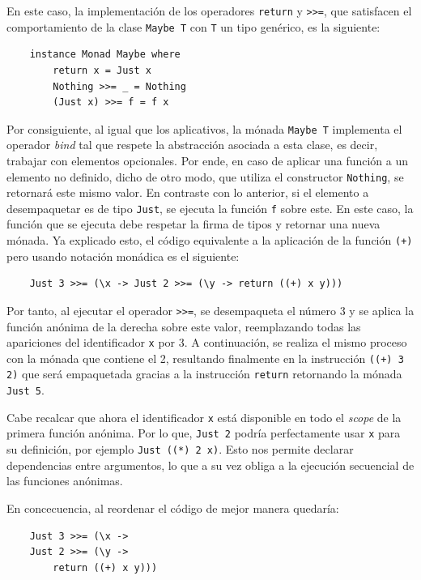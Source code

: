 En este caso, la implementación de los operadores \verb|return| y \verb|>>=|, que satisfacen el comportamiento de la clase \verb|Maybe T| con \verb|T| un tipo genérico, es la siguiente:

\begin{verbatim}
    instance Monad Maybe where
        return x = Just x
        Nothing >>= _ = Nothing
        (Just x) >>= f = f x
\end{verbatim}

Por consiguiente, al igual que los aplicativos, la mónada \verb|Maybe T| implementa el operador \textit{bind} tal que respete la abstracción asociada a esta clase, es decir, trabajar con elementos opcionales. Por ende, en caso de aplicar una función a un elemento no definido, dicho de otro modo, que utiliza el constructor \verb|Nothing|, se retornará este mismo valor. En contraste con lo anterior, si el elemento a desempaquetar es de tipo \verb|Just|, se ejecuta la función \verb|f| sobre este. En este caso, la función que se ejecuta debe respetar la firma de tipos y retornar una nueva mónada. Ya explicado esto, el código equivalente a la aplicación de la función \verb|(+)| pero usando notación monádica es el siguiente: 

\begin{verbatim}
    Just 3 >>= (\x -> Just 2 >>= (\y -> return ((+) x y)))
\end{verbatim}

Por tanto, al ejecutar el operador \verb|>>=|, se desempaqueta el número 3 y se aplica la función anónima de la derecha sobre este valor, reemplazando todas las apariciones del identificador \texttt{x} por 3. A continuación, se realiza el mismo proceso con la mónada que contiene el 2, resultando finalmente en la instrucción \texttt{((+) 3 2)} que será empaquetada gracias a la instrucción \texttt{return} retornando la mónada \texttt{Just 5}.

Cabe recalcar que ahora el identificador \texttt{x} está disponible en todo el \textit{scope} de la primera función anónima. Por lo que, \texttt{Just 2} podría perfectamente usar \texttt{x} para su definición, por ejemplo \texttt{Just ((*) 2 x)}. Esto nos permite declarar dependencias entre argumentos, lo que a su vez obliga a la ejecución secuencial de las funciones anónimas.

En concecuencia, al reordenar el código de mejor manera quedaría:

\begin{verbatim}
    Just 3 >>= (\x -> 
    Just 2 >>= (\y -> 
        return ((+) x y)))
\end{verbatim}

